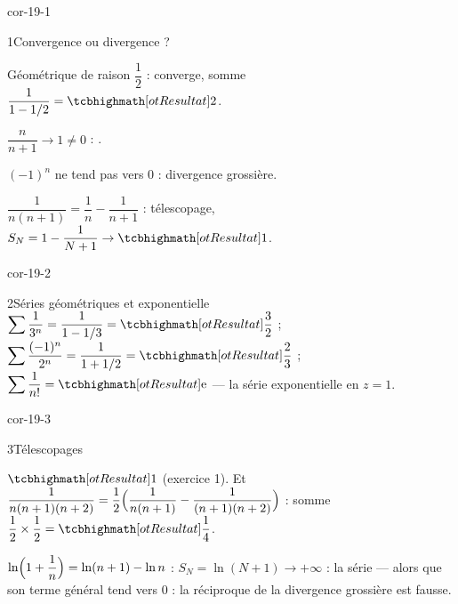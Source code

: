 
\corrigesSouples

\begin{blocLivre}{cor-19-1}
\begin{corrige}{1}{Convergence ou divergence ?}
\begin{questions}
  \item Géométrique de raison $\dfrac12$ : converge, somme
    $\dfrac{1}{1-1/2}=\res{2}$.
  \item $\dfrac{n}{n+1}\to1\neq0$ : .
  \item $(-1)^{n}$ ne tend pas vers $0$ : divergence grossière.
  \item $\dfrac{1}{n(n+1)}=\dfrac1n-\dfrac{1}{n+1}$ : télescopage,
    $S_N=1-\dfrac{1}{N+1}\to\res{1}$.
\end{questions}
\end{corrige}
\end{blocLivre}

\begin{blocLivre}{cor-19-2}
\begin{corrige}{2}{Séries géométriques et exponentielle}
$\displaystyle\sum\frac{1}{3^{n}}=\frac{1}{1-1/3}=\res{\frac32}$ ;
$\displaystyle\sum\frac{(-1)^{n}}{2^{n}}=\frac{1}{1+1/2}=\res{\frac23}$ ;
$\displaystyle\sum\frac{1}{n!}=\res{\mathrm{e}}$ — la série exponentielle
en $z=1$.
\end{corrige}
\end{blocLivre}

\begin{blocLivre}{cor-19-3}
\begin{corrige}{3}{Télescopages}
\begin{questions}
  \item $\res{1}$ (exercice 1). Et
    $\dfrac{1}{n(n+1)(n+2)}=\dfrac12\Bigl(\dfrac{1}{n(n+1)}
    -\dfrac{1}{(n+1)(n+2)}\Bigr)$ : somme
    $\dfrac12\times\dfrac12=\res{\dfrac14}$.
  \item $\ln\Bigl(1+\dfrac1n\Bigr)=\ln(n+1)-\ln n$ :
    $S_N=\ln(N+1)\to+\infty$ : la série  — alors que
    son terme général tend vers $0$ : la réciproque de la divergence
    grossière est fausse.
\end{questions}
\end{corrige}
\end{blocLivre}

